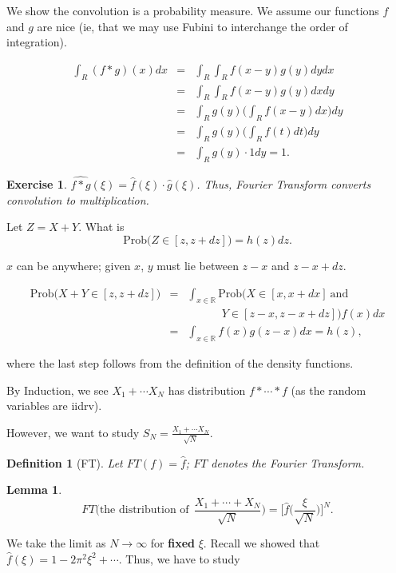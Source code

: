 \documentclass[12pt,letterpaper]{report}
\newcommand\be{\begin{equation}}
\newcommand\ee{\end{equation}}
\newcommand\bea{\begin{eqnarray}}
\newcommand\eea{\end{eqnarray}}
\newcommand{\R}{\ensuremath{\mathbb{R}}}
\newtheorem{lem}[thm]{Lemma}
\newtheorem{defi}[thm]{Definition}
\newtheorem{exe}[thm]{Exercise}
\begin{document}
We show the convolution is a probability measure. We assume our
functions $f$ and $g$ are nice (ie, that we may use Fubini to
interchange the order of integration).

\bea \int_R (f \ast g)(x)dx &=& \int_R \int_R f(x-y)g(y)dydx
\nonumber\\ &=& \int_R \int_R f(x-y)g(y)dxdy \nonumber\\ &=&
\int_R g(y) \Bigg( \int_R f(x-y)dx \Bigg)dy \nonumber\\ &=& \int_R
g(y) \Bigg( \int_R f(t)dt \Bigg)dy \nonumber\\ &=& \int_R g(y)
\cdot 1 dy = 1. \eea

\begin{exe} $\widehat{f \ast g}(\xi) = \hat{f}(\xi) \cdot \hat{g}(\xi)$.
Thus, Fourier Transform converts convolution to multiplication.
\end{exe}

Let $Z = X+Y$. What is \be \mbox{Prob}\Big( Z \in [z,z+dz] \Big) =
h(z)dz. \ee

$x$ can be anywhere; given $x$, $y$ must lie between $z-x$ and
$z-x+dz$.

\bea \mbox{Prob}\Big(X+Y \in [z,z+dz] \Big) &=& \int_{x \in \R}
\mbox{Prob}\Big(X \in [x,x+dx] \ \mbox{and} \nonumber\\ & & \ \ \
\ \ \ \ \ \ \ \ \ \ \ Y \in [z-x,z-x+dz] \Big)f(x)dx \nonumber\\
&=& \int_{x \in \R} f(x)g(z-x)dx = h(z), \eea

where the last step follows from the definition of the density
functions.

By Induction, we see $X_1 + \cdots X_N$ has distribution $f \ast
\cdots \ast f$ (as the random variables are iidrv).

However, we want to study $S_N = \frac{X_1 + \cdots
X_N}{\sqrt{N}}$.

\begin{defi}[FT] Let $FT(f) = \hat{f}$; $FT$ denotes the Fourier
Transform. \end{defi}

\begin{lem}
\be FT\Bigg(\mbox{the distribution of} \ \ \frac{X_1 + \cdots +
X_N}{\sqrt{N}}\Bigg) = \Bigg[\hat{f}\Big( \frac{\xi}{\sqrt{N}}
\Big) \Bigg]^N. \ee
\end{lem}

We take the limit as $N \rightarrow \infty$ for \textbf{fixed}
$\xi$. Recall we showed that $\hat{f}(\xi) = 1 - 2\pi^2 \xi^2 +
\cdots$. Thus, we  have to study
\end{document}
